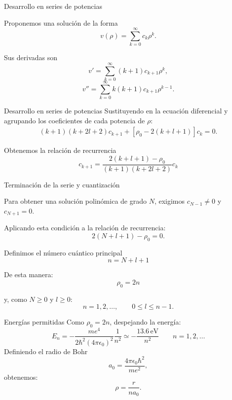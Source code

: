 \begin{frame}{Desarrollo en series de potencias}

    Proponemos una solución de la forma
    \[
        v(\rho)=\sum_{k=0}^{\infty}c_k\rho^k.
    \]

    Sus derivadas son
    \[
        v'=\sum_{k=0}^{\infty}(k+1)c_{k+1}\rho^k,
    \]
    \[
        v''=\sum_{k=0}^{\infty}k(k+1)c_{k+1}\rho^{k-1}.
    \]

\end{frame}
\begin{frame}{Desarrollo en series de potencias}
    Sustituyendo en la ecuación diferencial y agrupando
    los coeficientes de cada potencia de $\rho$:
    \[
    \begin{aligned}
    (k+1)(k+2l+2)c_{k+1}+[\rho_0-2(k+l+1)]c_k=0.
    \end{aligned}
    \]

    Obtenemos la relación de recurrencia
    \begin{equation}
        c_{k+1}=
        \frac{2(k+l+1)-\rho_0}
        {(k+1)(k+2l+2)}c_k
    \end{equation}
        
\end{frame}
\begin{frame}{Terminación de la serie y cuantización}

    Para obtener una solución polinómica de grado $N$,
    exigimos $c_{N-1}\neq0$ y  $c_{N+1}=0.$


    Aplicando esta condición a la relación de recurrencia:
    \[
        2(N+l+1)-\rho_0=0.
    \]

        Definimos el número cuántico principal
    \[
        n=N+l+1
    \]

    De esta manera:
    \[
        \rho_0=2n
    \]

    y, como $N\geq0$ y $l\geq0$:
    \[
        n=1,2,\ldots,\qquad 0\leq l\leq n-1.
    \]

\end{frame}
\begin{frame}{Energías permitidas}
    Como $\rho_0=2n$, despejando la energía:
    \[
        E_n=
        -\frac{me^4}{2\hbar^2(4\pi\epsilon_0)^2}
        \frac{1}{n^2} \simeq-\frac{13.6\,\text{eV}}{n^2}\qquad n=1,2,\ldots
    \]
    Definiendo el radio de Bohr
    \[
        a_0=\frac{4\pi\epsilon_0\hbar^2}{me^2},
    \]
    obtenemos:
    \[
        \rho=\frac{r}{na_0}.
    \]
\end{frame}
